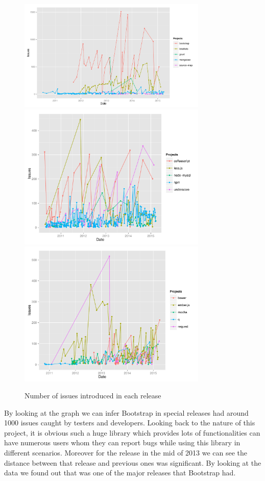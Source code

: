 \begin{figure}[thb!]
	\caption{Number of issues introduced in each release}
	\label{fig:number_of_issues}
	\includegraphics[width=90mm,scale=0.5]{figures/issues_per_release}
	\includegraphics[width=90mm,scale=0.5]{figures/issues_per_release_2}
	\includegraphics[width=90mm,scale=0.5]{figures/issues_per_release_3}
\end{figure}

By looking at the graph we can infer Bootstrap in special releases had around 1000 issues caught by testers and developers. Looking back to the nature of this project, it is obvious such a huge library which provides lots of functionalities can have numerous users whom they can report bugs while using this library in different scenarios. Moreover for the release in the mid of 2013 we can see the distance between that release and previous ones was significant. By looking at the data we found out that was one of the major releases that Bootstrap had. 

